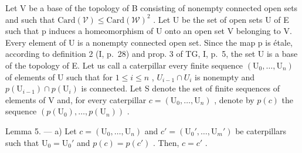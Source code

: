 Let V be a base of the topology of B consisting of nonempty connected open sets and such that \(\text{Card}(\mathcal{V}) \leqslant \text{Card}(\mathcal{W})^{2}\) . Let U be the set of open sets U of E such that p induces a homeomorphism of U onto an open set V belonging to V. Every element of U is a nonempty connected open set. Since the map p is étale, according to definition 2 (I, p.~28) and prop. 3 of TG, I, p.~5, the set U is a base of the topology of E. Let us call a caterpillar every finite sequence \((\mathrm{U}_{0}, \ldots, \mathrm{U}_{n})\) of elements of U such that for \(1 \leqslant i \leqslant n\) , \(U_{i-1} \cap U_{i}\) is nonempty and \(p(\mathrm{U}_{i-1}) \cap p(\mathrm{U}_{i})\) is connected. Let S denote the set of finite sequences of elements of V and, for every caterpillar \(c = (\mathrm{U}_{0}, \ldots, \mathrm{U}_{n})\) , denote by \(p(c)\) the sequence \((p(\mathrm{U}_{0}), \ldots, p(\mathrm{U}_{n}))\) .

Lemma 5. --- a) Let \(c = (\mathrm{U}_0, \ldots, \mathrm{U}_n)\) and \(c' = (\mathrm{U}_0', \ldots, \mathrm{U}_m')\) be caterpillars such that \(\mathrm{U}_0 = \mathrm{U}_0'\) and \(p(c) = p(c')\) . Then, \(c = c'\) .

